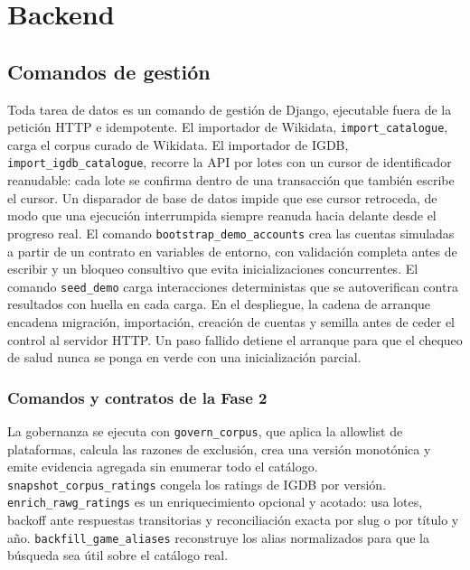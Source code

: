 \section{Backend}\label{sec:impl-backend}

\subsection{Comandos de gestión}\label{sec:impl-comandos}

Toda tarea de datos es un comando de gestión de Django, ejecutable fuera de la petición HTTP e
idempotente. El importador de Wikidata, \texttt{import\_catalogue}, carga el corpus curado
de Wikidata. El importador de IGDB, \texttt{import\_igdb\_catalogue}, recorre la API por
lotes con un cursor de identificador reanudable: cada lote se confirma dentro de una
transacción que también escribe el cursor. Un disparador de base de datos impide que ese
cursor retroceda, de modo que una ejecución interrumpida siempre reanuda hacia delante desde
el progreso real. El comando \texttt{bootstrap\_demo\_accounts} crea las cuentas simuladas a
partir de un contrato en variables de entorno, con validación completa antes de escribir y un
bloqueo consultivo que evita inicializaciones concurrentes. El comando \texttt{seed\_demo}
carga interacciones deterministas que se autoverifican contra resultados con huella en cada
carga. En el despliegue, la cadena de arranque encadena migración, importación, creación de
cuentas y semilla antes de ceder el control al servidor HTTP. Un paso fallido detiene el
arranque para que el chequeo de salud nunca se ponga en verde con una inicialización parcial.

\subsubsection{Comandos y contratos de la Fase 2}

La gobernanza se ejecuta con \texttt{govern\_corpus}, que aplica la allowlist de plataformas,
calcula las razones de exclusión, crea una versión monotónica y emite evidencia agregada sin
enumerar todo el catálogo. \texttt{snapshot\_corpus\_ratings} congela los ratings de IGDB
por versión. \texttt{enrich\_rawg\_ratings} es un enriquecimiento opcional y acotado: usa
lotes, backoff ante respuestas transitorias y reconciliación exacta por slug o por título y
año. \texttt{backfill\_game\_aliases} reconstruye los alias normalizados para que la
búsqueda sea útil sobre el catálogo real.

